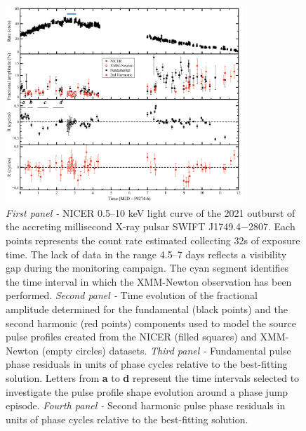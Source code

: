 \documentclass[fleqn,usenatbib]{mnras}
\newcommand{\swiftj}{SWIFT J1749.4$-$2807}
\newcommand{\nicer}{NICER}
\newcommand{\xmm}{XMM-Newton}
\begin{document}
\begin{figure}
\centering
\includegraphics[width=0.8\textwidth]{plot_lc_phase_residuals}
\caption{\textit{First panel -} \nicer{} 0.5--10 keV light curve of the 2021 outburst of the accreting millisecond X-ray pulsar \swiftj{}. Each points represents the count rate estimated collecting 32s of exposure time. The lack of data in the range 4.5--7 days reflects a visibility gap during the monitoring campaign. The cyan segment identifies the time interval in which the \xmm{} observation has been performed. \textit{Second panel -} Time evolution of the fractional amplitude determined for the fundamental (black points) and the second harmonic (red points) components used to model the source pulse profiles created from the \nicer{} (filled squares) and \xmm{} (empty circles) datasets. \textit{Third panel -} Fundamental pulse phase residuals in units of phase cycles relative to the best-fitting solution. Letters from \textbf{a} to \textbf{d} represent the time intervals selected to investigate the pulse profile shape evolution around a phase jump episode. \textit{Fourth panel -} Second harmonic pulse phase residuals in units of phase cycles relative to the best-fitting solution.}
\label{fig:phase_fit}
\end{figure} 


\end{document}
